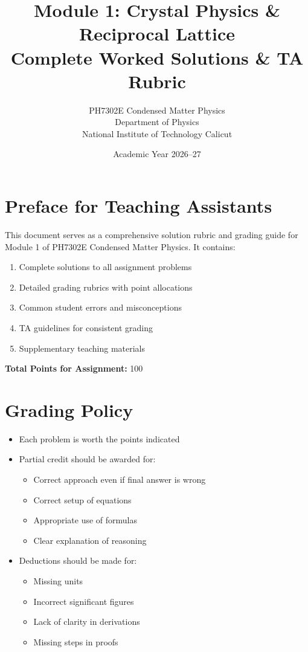 \documentclass[12pt,a4paper]{article}
\title{Module 1: Crystal Physics \& Reciprocal Lattice\\ \large Complete Worked Solutions \& TA Rubric}
\author{PH7302E Condensed Matter Physics \\ Department of Physics \\ National Institute of Technology Calicut}
\date{Academic Year 2026--27}
\begin{document}
\maketitle

\tableofcontents
\newpage

\section*{Preface for Teaching Assistants}
This document serves as a comprehensive solution rubric and grading guide for Module 1 of PH7302E Condensed Matter Physics. It contains:

\begin{enumerate}
    \item Complete solutions to all assignment problems
    \item Detailed grading rubrics with point allocations
    \item Common student errors and misconceptions
    \item TA guidelines for consistent grading
    \item Supplementary teaching materials
\end{enumerate}

\textbf{Total Points for Assignment:} 100

\section{Grading Policy}
\begin{itemize}
    \item Each problem is worth the points indicated
    \item Partial credit should be awarded for:
    \begin{itemize}
        \item Correct approach even if final answer is wrong
        \item Correct setup of equations
        \item Appropriate use of formulas
        \item Clear explanation of reasoning
    \end{itemize}
    \item Deductions should be made for:
    \begin{itemize}
        \item Missing units
        \item Incorrect significant figures
        \item Lack of clarity in derivations
        \item Missing steps in proofs
    \end{itemize}
\end{itemize}
\end{document}
